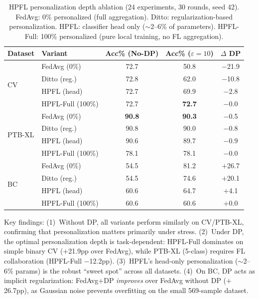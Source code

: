 \documentclass[conference,a4paper]{IEEEtran}
\begin{document}
\begin{table}[htbp]
\centering
\caption{HPFL personalization depth ablation (24 experiments, 30 rounds, seed 42). FedAvg: 0\% personalized (full aggregation). Ditto: regularization-based personalization. HPFL: classifier head only ($\sim$2--6\% of parameters). HPFL-Full: 100\% personalized (pure local training, no FL aggregation).}
\label{tab:ablation}
\small
\begin{tabular}{llccc}
\toprule
\textbf{Dataset} & \textbf{Variant} & \textbf{Acc\% (No-DP)} & \textbf{Acc\% ($\varepsilon{=}10$)} & \textbf{$\Delta$ DP} \\
\midrule
\multirow{4}{*}{CV} & FedAvg (0\%) & 72.7 & 50.8 & $-$21.9 \\
 & Ditto (reg.) & 72.8 & 62.0 & $-$10.8 \\
 & HPFL (head) & 72.7 & 69.9 & $-$2.8 \\
 & HPFL-Full (100\%) & 72.7 & \textbf{72.7} & $-$0.0 \\
\midrule
\multirow{4}{*}{PTB-XL} & FedAvg (0\%) & \textbf{90.8} & \textbf{90.3} & $-$0.5 \\
 & Ditto (reg.) & 90.8 & 90.0 & $-$0.8 \\
 & HPFL (head) & 90.6 & 89.7 & $-$0.9 \\
 & HPFL-Full (100\%) & 78.1 & 78.1 & $-$0.0 \\
\midrule
\multirow{4}{*}{BC} & FedAvg (0\%) & 54.5 & 81.2 & $+$26.7 \\
 & Ditto (reg.) & 54.5 & 74.6 & $+$20.1 \\
 & HPFL (head) & 60.6 & 64.7 & $+$4.1 \\
 & HPFL-Full (100\%) & 60.6 & 60.6 & $+$0.0 \\
\bottomrule
\end{tabular}

\vspace{1mm}
\footnotesize{Key findings: (1)~Without DP, all variants perform similarly on CV/PTB-XL, confirming that personalization matters primarily under stress. (2)~Under DP, the optimal personalization depth is task-dependent: HPFL-Full dominates on simple binary CV ($+$21.9pp over FedAvg), while PTB-XL (5-class) requires FL collaboration (HPFL-Full $-$12.2pp). (3)~HPFL's head-only personalization ($\sim$2--6\% params) is the robust ``sweet spot'' across all datasets. (4)~On BC, DP acts as implicit regularization: FedAvg+DP \textit{improves} over FedAvg without DP ($+$26.7pp), as Gaussian noise prevents overfitting on the small 569-sample dataset.}
\end{table}
\end{document}
